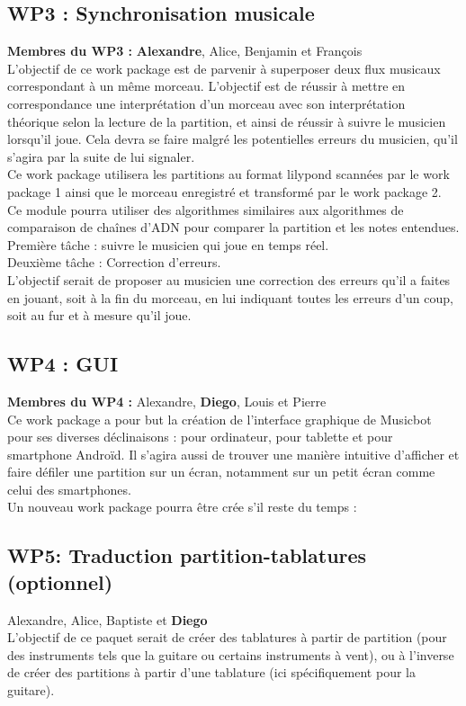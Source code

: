 \documentclass{article}
\begin{document}
\subsection{WP3 : Synchronisation musicale}
\noindent \textbf{Membres du WP3 : } {\bf Alexandre}, Alice, Benjamin et François\\
L'objectif de ce work package est de parvenir à superposer deux flux musicaux correspondant à un même morceau. L'objectif est de réussir à mettre en correspondance une interprétation d'un morceau avec son interprétation théorique selon la lecture de la partition, et ainsi de réussir à suivre le musicien lorsqu'il joue. Cela devra se faire malgré les potentielles erreurs du musicien, qu'il s'agira par la suite de lui signaler.\\
Ce work package utilisera les partitions au format lilypond scannées par le work package 1 ainsi que le morceau enregistré et transformé par le work package 2.\\
Ce module pourra utiliser des algorithmes similaires aux algorithmes de comparaison de chaînes d'ADN pour comparer la partition et les notes entendues.
Première tâche : suivre le musicien qui joue en temps réel.\\
Deuxième tâche : Correction d'erreurs.\\
L'objectif serait de proposer au musicien une correction des erreurs qu'il a faites en jouant, soit à la fin du morceau, en lui indiquant toutes les erreurs d'un coup, soit au fur et à mesure qu'il joue.

\subsection{WP4 : GUI}
\noindent \textbf{Membres du WP4 : } Alexandre, {\bf Diego}, Louis et Pierre\\
Ce work package a pour but la création de l'interface graphique de Musicbot pour ses diverses déclinaisons : pour ordinateur, pour tablette et pour smartphone Androïd. Il s'agira aussi de trouver une manière intuitive d'afficher et faire défiler une partition sur un écran, notamment sur un petit écran comme celui des smartphones.\\

\noindent Un nouveau work package pourra \^etre crée s'il reste du temps :
\subsection{WP5: Traduction partition-tablatures (optionnel)}
Alexandre, Alice, Baptiste et \textbf{Diego}\\
L'objectif de ce paquet serait de créer des tablatures à partir de partition (pour des instruments tels que la guitare ou certains instruments à vent), ou à l'inverse de créer des partitions à partir d'une tablature (ici spécifiquement pour la guitare).
\end{document}
